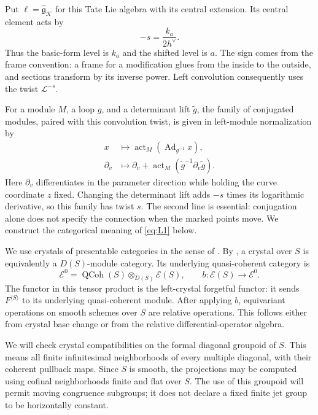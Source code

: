 Put $\ell=\widehat{\mathfrak g}_{\mathcal K}$ for this Tate Lie algebra
with its central extension.  Its central element acts by
\[
                         -s=\frac{k_a}{2h^\vee}.
\]
Thus the basic-form level is $k_a$ and the shifted level is $a$.  The
sign comes from the frame convention: a frame for a modification glues
from the inside to the outside, and sections transform by its inverse
power.  Left convolution consequently uses the twist $\mathcal L^{-s}$.

For a module $M$, a loop $g$, and a determinant lift $\widetilde g$, the
family of conjugated modules, paired with this convolution twist, is
given in left-module normalization by
\begin{equation}\label{eq:L1}
 \begin{split}
 x&\longmapsto\operatorname{act}_M(\operatorname{Ad}_{g^{-1}}x),\\
 \partial_v&\longmapsto\partial_v+
       \operatorname{act}_M(\widetilde g^{-1}\partial_v\widetilde g).
 \end{split}
\end{equation}
Here $\partial_v$ differentiates in the parameter direction while holding
the curve coordinate $z$ fixed.  Changing the determinant lift adds
$-s$ times its logarithmic derivative, so this family has twist $s$.
The second line is essential: conjugation alone does not specify the
connection when the marked points move.  We construct the categorical
meaning of \eqref{eq:L1} below.

We use crystals of presentable categories in the sense of
\cite[Section~2 and Appendix~B, especially Sections~B.3.8--B.3.11
and~B.14]{GLCII}.  By
\cite[Theorem~2.6.3]{Gaitsgory1Affine}, a crystal over $S$ is equivalently
a $D(S)$-module category.  Its underlying quasi-coherent category is
\[
 \mathcal E^0=\operatorname{QCoh}(S)
                   \otimes_{D(S)}\mathcal E(S),
 \qquad b:\mathcal E(S)\longrightarrow\mathcal E^0.
\]
The functor in this tensor product is the left-crystal forgetful functor:
it sends $F^{\langle S\rangle}$ to its underlying quasi-coherent module.
After applying $b$, equivariant operations on smooth schemes over $S$
are relative operations.  This follows either from crystal base change
or from the relative differential-operator algebra.

We will check crystal compatibilities on the formal diagonal groupoid
of $S$.  This means all finite infinitesimal neighborhoods of every
multiple diagonal, with their coherent pullback maps.  Since $S$ is
smooth, the projections may be computed using cofinal neighborhoods
finite and flat over $S$.  The use of this groupoid will permit moving
congruence subgroups; it does not declare a fixed finite jet group to
be horizontally constant.

